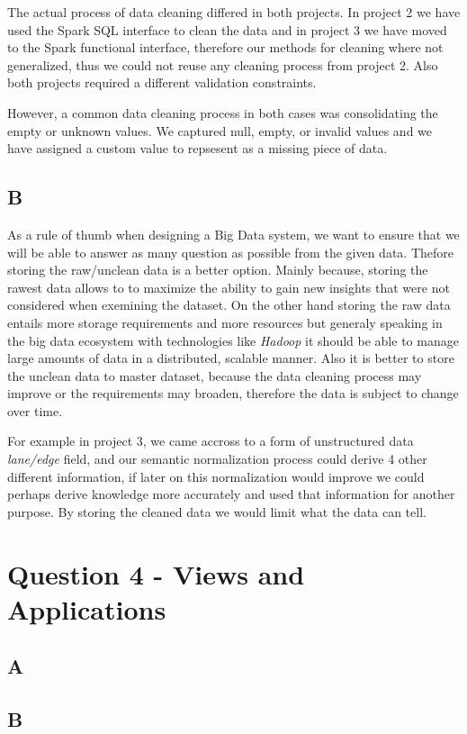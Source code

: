 \documentclass[format=acmsmall, review=false, screen=true]{acmart}
\begin{document}
The actual process of data cleaning differed in both projects. In project 2 we have used the Spark SQL interface to clean the data and in project 3 we have moved to the Spark functional interface, therefore our methods for cleaning where not generalized, thus we could not reuse any cleaning process from project 2. Also both projects required a different validation constraints.

However, a common data cleaning process in both cases was consolidating the empty or unknown values. We captured null, empty, or invalid values and we have assigned a custom value to repsesent as a missing piece of data.


\subsection{B}
As a rule of thumb when designing a Big Data system, we want to ensure that we will be able to answer as many question as possible from the given data. Thefore storing the raw/unclean data is a better option. Mainly because, storing the rawest data allows to to maximize the ability to gain new insights that were not considered when exemining the dataset. On the other hand storing the raw data entails more storage requirements and more resources but generaly speaking in the big data ecosystem with technologies like \textit{Hadoop} it should be able to manage large amounts of data in a distributed, scalable manner. Also it is better to store the unclean data to master dataset, because the data cleaning process may improve or the requirements may broaden, therefore the data is subject to change over time.

For example in project 3, we came accross to a form of unstructured data \textit{lane/edge} field, and our semantic normalization process could derive 4 other different information, if later on this normalization would improve we could perhaps derive knowledge more accurately and used that information for another purpose. By storing the cleaned data we would limit what the data can tell. 

\section{Question 4 - Views and Applications }

\subsection{A}

\subsection{B}
\end{document}
